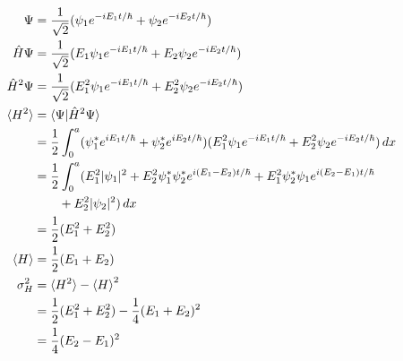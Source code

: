 \documentclass{article}
\begin{document}
\begin{align*}
  \Psi           & = \frac{1}{\sqrt{2}} (\psi_1 e^{-i E_1 t/ \hbar} + \psi_2 e^{-i E_2 t / \hbar})                                                                                    \\
  \hat{H} \Psi   & = \frac{1}{\sqrt{2}} (E_1 \psi_1 e^{-i E_1 t / \hbar} + E_2 \psi_2 e^{-i E_2 t / \hbar})                                                                           \\
  \hat{H}^2 \Psi & = \frac{1}{\sqrt{2}} (E_1^2 \psi_1 e^{-i E_1 t / \hbar} + E_2^2 \psi_2 e^{-i E_2 t / \hbar})                                                                       \\
  \braket{H^2}   & = \braket{\Psi | \hat{H}^2 \Psi}                                                                                                                                   \\
                 & = \frac{1}{2} \int_0^a (\psi_1^* e^{i E_1 t / \hbar} + \psi_2^* e^{i E_2 t / \hbar}) (E_1^2 \psi_1 e^{-i E_1 t / \hbar} + E_2^2 \psi_2 e^{-i E_2 t / \hbar}) \,d x \\
                 & = \frac{1}{2} \int_0^a (E_1^2 |\psi_1|^2 + E_2^2 \psi_1^* \psi_2^* e^{i (E_1 - E_2) t / \hbar} + E_1^2 \psi_2^* \psi_1 e^{i (E_2 - E_1) t / \hbar}                 \\
                 & \qquad + E_2^2 |\psi_2|^2) \,d x                                                                                                                                   \\
                 & = \frac{1}{2} (E_1^2 + E_2^2)                                                                                                                                      \\
  \braket{H}     & = \frac{1}{2} (E_1 + E_2)                                                                                                                                          \\
  \sigma_H^2     & = \braket{H^2} - \braket{H}^2                                                                                                                                      \\
                 & = \frac{1}{2} (E_1^2 + E_2^2) - \frac{1}{4} (E_1 + E_2)^2                                                                                                          \\
                 & = \frac{1}{4} (E_2 - E_1)^2
\end{align*}
\end{document}
